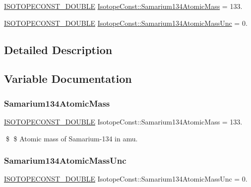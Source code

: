 \begin{DoxyCompactItemize}
\item 
\mbox{\hyperlink{group___isotope_const-_macros_ga8f45a7272ce02c0b4c65c44636ed719a}{I\+S\+O\+T\+O\+P\+E\+C\+O\+N\+S\+T\+\_\+\+D\+O\+U\+B\+LE}} \mbox{\hyperlink{group___isotope_const-_samarium-_sm134_gab1bffc024c903f059b90c7397a328edb}{Isotope\+Const\+::\+Samarium134\+Atomic\+Mass}} = 133.
\item 
\mbox{\hyperlink{group___isotope_const-_macros_ga8f45a7272ce02c0b4c65c44636ed719a}{I\+S\+O\+T\+O\+P\+E\+C\+O\+N\+S\+T\+\_\+\+D\+O\+U\+B\+LE}} \mbox{\hyperlink{group___isotope_const-_samarium-_sm134_gaecd4f3dd682d9ce8bce63866f3010eb8}{Isotope\+Const\+::\+Samarium134\+Atomic\+Mass\+Unc}} = 0.
\end{DoxyCompactItemize}


\subsection{Detailed Description}


\subsection{Variable Documentation}
\mbox{\label{group___isotope_const-_samarium-_sm134_gab1bffc024c903f059b90c7397a328edb}} 
\subsubsection{\texorpdfstring{Samarium134\+Atomic\+Mass}{Samarium134AtomicMass}}
{\footnotesize\ttfamily \mbox{\hyperlink{group___isotope_const-_macros_ga8f45a7272ce02c0b4c65c44636ed719a}{I\+S\+O\+T\+O\+P\+E\+C\+O\+N\+S\+T\+\_\+\+D\+O\+U\+B\+LE}} Isotope\+Const\+::\+Samarium134\+Atomic\+Mass = 133.}

\$ \$ Atomic mass of Samarium-\/134 in amu. \mbox{\label{group___isotope_const-_samarium-_sm134_gaecd4f3dd682d9ce8bce63866f3010eb8}} 
\subsubsection{\texorpdfstring{Samarium134\+Atomic\+Mass\+Unc}{Samarium134AtomicMassUnc}}
{\footnotesize\ttfamily \mbox{\hyperlink{group___isotope_const-_macros_ga8f45a7272ce02c0b4c65c44636ed719a}{I\+S\+O\+T\+O\+P\+E\+C\+O\+N\+S\+T\+\_\+\+D\+O\+U\+B\+LE}} Isotope\+Const\+::\+Samarium134\+Atomic\+Mass\+Unc = 0.}

